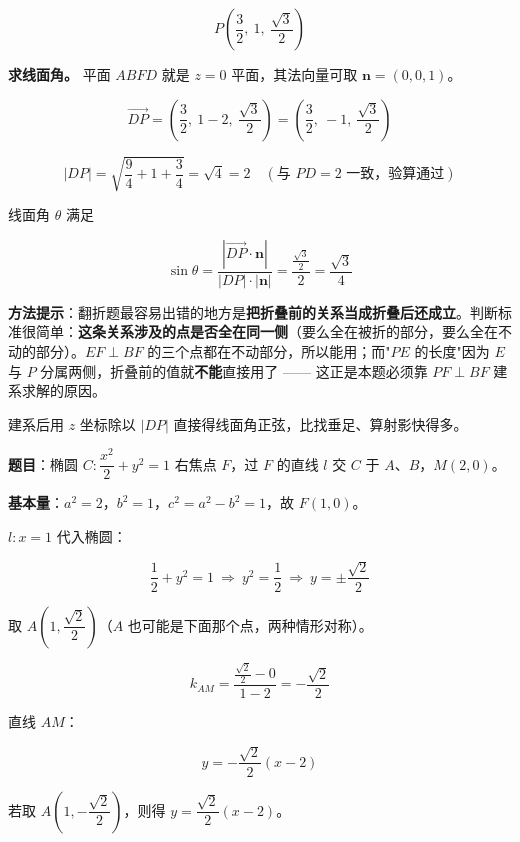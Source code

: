 \[P\left(\frac32,\ 1,\ \frac{\sqrt3}2\right)\]

\textbf{求线面角。} 平面 $ABFD$ 就是 $z=0$ 平面，其法向量可取 $\boldsymbol n=(0,0,1)$。

\[\overrightarrow{DP}=\left(\frac32,\ 1-2,\ \frac{\sqrt3}2\right)=\left(\frac32,\ -1,\ \frac{\sqrt3}2\right)\]

\[|DP|=\sqrt{\frac94+1+\frac34}=\sqrt4=2\quad(\text{与 }PD=2\text{ 一致，验算通过})\]

线面角 $\theta$ 满足

\[\sin\theta=\frac{\left|\overrightarrow{DP}\cdot\boldsymbol n\right|}{|DP|\cdot|\boldsymbol n|}=\frac{\frac{\sqrt3}2}2=\frac{\sqrt3}4\]


\begin{gktip}
\textbf{方法提示}：翻折题最容易出错的地方是\textbf{把折叠前的关系当成折叠后还成立}。判断标准很简单：\textbf{这条关系涉及的点是否全在同一侧}（要么全在被折的部分，要么全在不动的部分）。$EF\perp BF$ 的三个点都在不动部分，所以能用；而"$PE$ 的长度"因为 $E$ 与 $P$ 分属两侧，折叠前的值就\textbf{不能}直接用了 —— 这正是本题必须靠 $PF\perp BF$ 建系求解的原因。

建系后用 $z$ 坐标除以 $|DP|$ 直接得线面角正弦，比找垂足、算射影快得多。
\end{gktip}

\par\medskip


\textbf{题目}：椭圆 $C:\dfrac{x^{2}}2+y^{2}=1$ 右焦点 $F$，过 $F$ 的直线 $l$ 交 $C$ 于 $A$、$B$，$M(2,0)$。

\textbf{基本量}：$a^{2}=2$，$b^{2}=1$，$c^{2}=a^{2}-b^{2}=1$，故 $F(1,0)$。


$l:x=1$ 代入椭圆：

\[\frac12+y^{2}=1\ \Longrightarrow\ y^{2}=\frac12\ \Longrightarrow\ y=\pm\frac{\sqrt2}2\]

取 $A\left(1,\dfrac{\sqrt2}2\right)$（$A$ 也可能是下面那个点，两种情形对称）。

\[k_{AM}=\frac{\frac{\sqrt2}2-0}{1-2}=-\frac{\sqrt2}2\]

直线 $AM$：

\[y=-\frac{\sqrt2}2(x-2)\]

若取 $A\left(1,-\dfrac{\sqrt2}2\right)$，则得 $y=\dfrac{\sqrt2}2(x-2)$。

